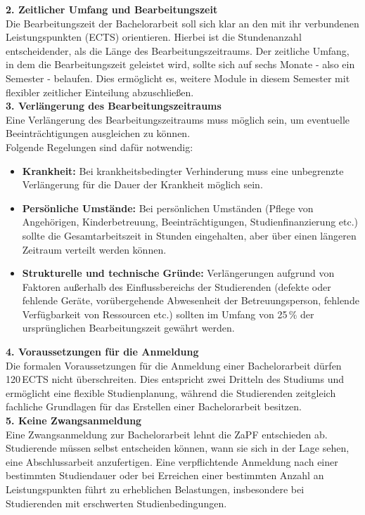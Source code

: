 \documentclass[DIV=calc]{scrartcl}
\begin{document}
\textbf{2. Zeitlicher Umfang und Bearbeitungszeit}\\
Die Bearbeitungszeit der Bachelorarbeit soll sich klar an den mit ihr verbundenen Leistungspunkten (ECTS) orientieren. Hierbei ist die Stundenanzahl entscheidender, als die Länge des Bearbeitungszeitraums.
Der zeitliche Umfang, in dem die Bearbeitungszeit geleistet wird, sollte sich auf sechs Monate - also ein Semester - belaufen. Dies ermöglicht es, weitere Module in diesem Semester mit flexibler zeitlicher Einteilung abzuschließen.\\

\textbf{3. Verlängerung des Bearbeitungszeitraums}\\
Eine Verlängerung des Bearbeitungszeitraums muss möglich sein, um eventuelle Beeinträchtigungen ausgleichen zu können.\\ Folgende Regelungen sind dafür notwendig:
\begin{itemize}
\item \textbf{Krankheit:} Bei krankheitsbedingter Verhinderung muss eine unbegrenzte Verlängerung für die Dauer der Krankheit möglich sein.
\item \textbf{Persönliche Umstände:} Bei persönlichen Umständen (Pflege von Angehörigen, Kinderbetreuung, Beeinträchtigungen, Studienfinanzierung etc.) sollte die Gesamtarbeitszeit in Stunden eingehalten, aber über einen längeren Zeitraum verteilt werden können.
\item \textbf{Strukturelle und technische Gründe:} Verlängerungen aufgrund von Faktoren außerhalb des Einflussbereichs der Studierenden (defekte oder fehlende Geräte, vorübergehende Abwesenheit der Betreuungsperson, fehlende Verfügbarkeit von Ressourcen etc.) sollten im Umfang von 25\,\% der ursprünglichen Bearbeitungszeit
gewährt werden.
\end{itemize}

\textbf{4. Voraussetzungen für die Anmeldung}\\
Die formalen Voraussetzungen für die Anmeldung einer Bachelorarbeit dürfen 120\,ECTS nicht überschreiten. Dies entspricht zwei Dritteln des Studiums und ermöglicht eine flexible Studienplanung, während die Studierenden zeitgleich fachliche Grundlagen für das Erstellen einer Bachelorarbeit besitzen. \\

\textbf{5. Keine Zwangsanmeldung}\\
Eine Zwangsanmeldung zur Bachelorarbeit lehnt die ZaPF entschieden ab. Studierende müssen selbst entscheiden können, wann sie sich in der Lage sehen, eine Abschlussarbeit anzufertigen. Eine verpflichtende Anmeldung nach einer bestimmten Studiendauer oder bei Erreichen einer bestimmten Anzahl an Leistungspunkten führt zu erheblichen Belastungen, insbesondere bei Studierenden mit erschwerten Studienbedingungen. \\
\end{document}
